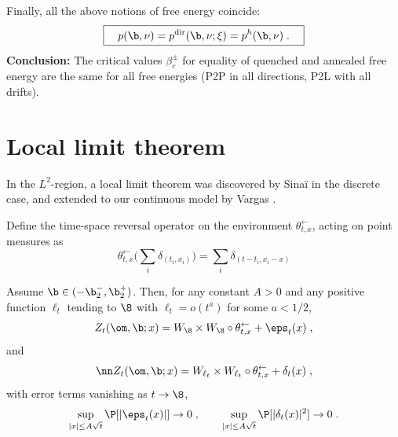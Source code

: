 Finally, all the above  notions of free energy coincide:
\begin{equation}
\label{eq:p0=}
\boxed{\quad p(\b, \nu) = p^{\rm dir}(\b, \nu; \xi ) = p^h(\b,\nu)\;.\quad }
\end{equation}
{\bf Conclusion:}  The critical values  $\beta_c^{\pm}$  for  equality of quenched and annealed free energy are the same for all free energies (P2P in all directions, P2L
with all drifts). 
 

 \section{Local limit theorem}

In the $L^2$-region, a local limit theorem was discovered by Sina\"i  \cite{Si95} in the discrete case, and extended to our continuous model by Vargas \cite{Va04}. 
 \medskip


Define the time-space reversal  operator on the environment $\theta_{t,x}^\leftarrow $,
acting on point measures as 
\begin{equation}\label{eq:thetainv}
\theta_{t,x}^\leftarrow (\sum_i \delta_{(t_i, x_i)}\big) = \sum_i \delta_{(t-t_i, x_i-x)}
\end{equation}

\begin{theorem} \label{prop:LLT}
Assume $\b \in (-\b_2^-, \b_2^+)$. Then, for any constant $A>0$ and any positive function $\ell_t$ tending to $\8$ with $\ell_t = o(t^a)$ for some $a<1/2$,
\begin{equation} \label{eq:llt1}
Z_t(\om, \b; x) = W_\8 \times W_\8 \circ \theta_{t,x}^\leftarrow + \eps_t(x) \;,
\end{equation}
 and
 \begin{equation}\nn
Z_t(\om, \b; x) = W_{\ell_t} \times W_{\ell_t} \circ \theta_{t,x}^\leftarrow + \delta_t(x) \;,
\end{equation}
 with error terms vanishing as $t \to \8$,
 $$
 \sup_{|x| \leq A \sqrt{t}} \P[ |\eps_t(x)|] \to 0 \;, \qquad  \sup_{|x| \leq A \sqrt{t}} \P[ |\delta_t(x)|^2] \to 0 \;.
 $$
\end{theorem}

